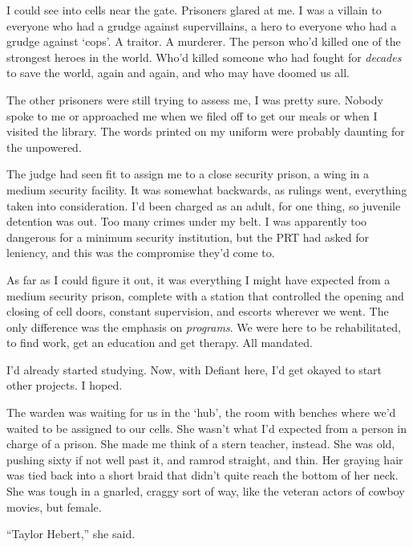 I could see into cells near the gate.  Prisoners glared at me.  I was a villain to everyone who had a grudge against supervillains, a hero to everyone who had a grudge against `cops'.  A traitor.  A murderer.  The person who'd killed one of the strongest heroes in the world.  Who'd killed someone who had fought for \emph{decades} to save the world, again and again, and who may have doomed us all.



The other prisoners were still trying to assess me, I was pretty sure.  Nobody spoke to me or approached me when we filed off to get our meals or when I visited the library.  The words printed on my uniform were probably daunting for the unpowered.



The judge had seen fit to assign me to a close security prison, a wing in a medium security facility.  It was somewhat backwards, as rulings went, everything taken into consideration.  I'd been charged as an adult, for one thing, so juvenile detention was out.  Too many crimes under my belt.  I was apparently too dangerous for a minimum security institution, but the PRT had asked for leniency, and this was the compromise they'd come to.



As far as I could figure it out, it was everything I might have expected from a medium security prison, complete with a station that controlled the opening and closing of cell doors, constant supervision, and escorts wherever we went.  The only difference was the emphasis on \emph{programs}.  We were here to be rehabilitated, to find work, get an education and get therapy.  All mandated.



I'd already started studying.  Now, with Defiant here, I'd get okayed to start other projects.  I hoped.



The warden was waiting for us in the `hub', the room with benches where we'd waited to be assigned to our cells.  She wasn't what I'd expected from a person in charge of a prison.  She made me think of a stern teacher, instead.  She was old, pushing sixty if not well past it, and ramrod straight, and thin.  Her graying hair was tied back into a short braid that didn't quite reach the bottom of her neck.  She was tough in a gnarled, craggy sort of way, like the veteran actors of cowboy movies, but female.



``Taylor Hebert,'' she said.



